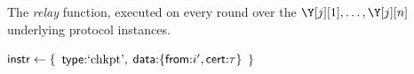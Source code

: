 \begin{algorithm}
  \caption{\label{alg.relay} The \rollerblade \emph{relay} function,
  executed on every round over the $\Y[j][1], \ldots, \Y[j][n]$ underlying
  protocol instances.}
  \begin{algorithmic}[1]
    \Function{\relay}{\,}

            \Continue
          \EndIf
          \State$\textsf{instr} \gets \{$
          \State\hspace{\algorithmicindent}$\textsf{type}{:} \text{`chkpt'},$
          \State\hspace{\algorithmicindent}$\textsf{data}{:} \{\textsf{from}{:} i', \textsf{cert}{:} \tau \}$
          \State$\}$
        \EndFor
      \EndFor
    \EndFunction
    \vskip2pt
  \end{algorithmic}
\end{algorithm}
